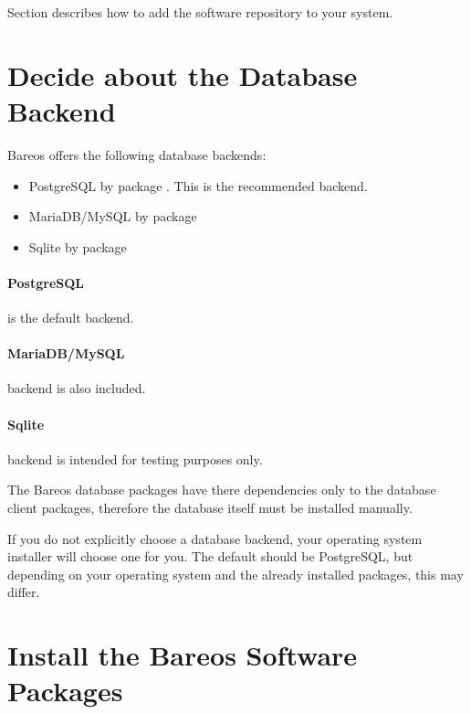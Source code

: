 Section  describes how to add the software repository to your system.


\section{Decide about the Database Backend}
    \label{sec:ChooseDatabaseBackend}

Bareos offers the following database backends:
\begin{itemize}
    \item PostgreSQL by package . This is the recommended backend.
    \item MariaDB/MySQL by package 
    \item Sqlite by package  \\
\end{itemize}

\paragraph{PostgreSQL} is the default backend.

\paragraph{MariaDB/MySQL} backend is also included.

\paragraph{Sqlite} backend is intended for testing purposes only.

The Bareos database packages have there dependencies only to the database client packages,
therefore the database itself must be installed manually.

If you do not explicitly choose a database backend, your operating system installer will choose one for you.
The default should be PostgreSQL, but depending on your operating system and the already installed packages,
this may differ.



\section{Install the Bareos Software Packages}
    \label{sec:InstallBareosPackages}

